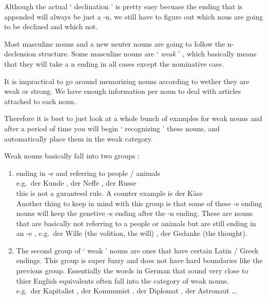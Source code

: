 \documentclass[a4paper,twocolumn,10pt]{article}
\newcommand{\newpar}
{\par \vspace{0.3cm}}
\begin{document}
Although the actual ` declination ' is pretty easy becuase the ending that is
appended will always be just a -n, we still have to figure out which nous are
going to be declined and which not.\newpar

Most masculine nouns and a new neuter nouns are going to follow the n-declension
structure. Some masculine nouns are ` \textit{weak} '  , which basically means
that they will take a n ending in all cases except the nominative case.\newpar

It is impractical to go around memorizing nouns according to wether they are
weak or strong. We have enough information per noun to deal with articles
attached to each noun.\newpar

Therefore it is best to just look at a whole bunch of examples for weak nouns
and after a period of time you will begin ` recognizing ' these nouns, and
automatically place them in the weak category.\newpar

Weak nouns basically fall into two groups :

\begin{enumerate}[noitemsep]

	\item ending in -e and referring to people / animals\\

		e.g.\ der Kunde , der Neffe , der Russe\\

		this is not a guranteed rule. A counter example is der Käse\\

		Another thing to keep in mind with this group is that some of these -e
		ending nouns will keep the genetive -s ending after the -n ending. These
		are nouns that are basically not referring to a people or animals but
		are still ending in an -e ,  e.g.\ der Wille (the volition, the will) ,
		der Gedanke (the thought).\\

	\item The second group of ` weak ' nouns are ones that have certain Latin /
		Greek endings. This group is super fuzzy and does not have hard
		boundaries like the previous group. Essentially the words in German that
		sound very close to thier English equivalents often fall into the
		category of weak nouns.\\

		e.g.\ der Kapitalist , der Kommunist , der Diplomat , der Astronaut
		\ldots

\end{enumerate}
\end{document}
